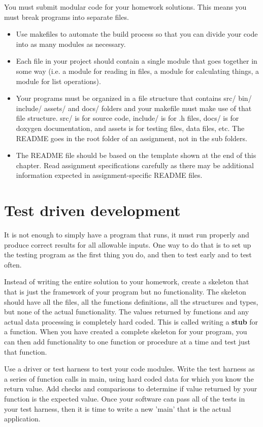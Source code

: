 You must submit modular code for your homework solutions.  This means you must break programs into separate files.   
\begin{itemize}
\item Use makefiles to automate the build process so that you can divide your code into as many modules as necessary.    
\item Each file in your project should contain a single module that goes together in some way (i.e. a module for reading in files,  a module for calculating things,  a module for list operations).
\item Your programs must be organized in a file structure that contains src/  bin/ include/  assets/  and docs/  folders and your makefile must make use of that file structure.   src/ is for source code,  include/ is for .h files,   docs/ is for doxygen documentation,  and assets is for testing files, data files, etc.   The README goes in the root folder of an assignment, not in the sub folders.
\item The README file should be based on the template shown at the end of this chapter.  Read assignment specifications carefully as there may be additional information  expected in assignment-specific README files.
\end{itemize}

\section{Test driven development }

 It is not enough to simply have a program that runs,   it must run properly and produce correct results for all allowable inputs.  One way to do that is to set up the testing program as the first thing you do, and then to test early and to test often.   
 
 Instead of writing the entire solution to your homework, create a skeleton that that is just the framework of your program but no functionality.  The skeleton should have all the files, all the functions  definitions,  all the structures and types, but none of the actual functionality.  The values returned by functions and any actual data processing is completely hard coded.    This is called writing a \textbf{stub} for a function.  
When you have created a complete skeleton for your program, you can then add functionality to one function or procedure at a time and test just that function.
 
Use a driver or test harness to test your code modules.  Write the test harness as a series of function calls in main, using hard coded data for which you know the return value.  Add checks and comparisons to determine if value returned by your function is the expected value.  Once your software can pass all of the tests in your test harness, then it is time to write a new 'main' that is the actual application.
 
